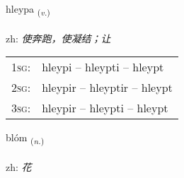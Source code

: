 \documentclass[frontgrid, backgrid]{flacards}\usepackage[]{graphicx}\usepackage[]{color}
\begin{document}
\renewcommand{\blhead}{\vskip5pt {\small\bfseries\footnotesize Sagnorð | 动词 }}
\renewcommand{\bcfoot}{\vskip5pt \hspace{2pt}{\small\bfseries\footnotesize 2K}}


{hleypa \small{\textsubscript{(\textit{v.})}} \\[1ex] %
\textphonetic{[l̥eiːpa]} \\
zh: \emph{使奔跑，使凝结；让} \\  [2ex]
\renewcommand*{\arraystretch}{0.8}
\begin{tabular}{p{1cm}l}
\textsc{1sg}: & hleypi -- hleypti -- hleypt \\ 
\textsc{2sg}: & hleypir -- hleyptir -- hleypt \\ 
\textsc{3sg}: & hleypir -- hleypti -- hleypt \\ 
\end{tabular}
}

\renewcommand{\flhead}{\vskip5pt \fboxsep=0pt {\small\bfseries\footnotesize Nafnorð | 名词}}
\renewcommand{\fcfoot}{\vskip5pt \fboxsep=0pt \hspace{2pt}{\small\bfseries\footnotesize 2K}}

\renewcommand{\blhead}{\vskip5pt {\small\bfseries\footnotesize Nafnorð | 名词 }}
\renewcommand{\bcfoot}{\vskip5pt \hspace{2pt}{\small\bfseries\footnotesize 2K}}


{blóm \small{\textsubscript{(\textit{n.})}} \\[1ex] %
\textphonetic{[plouːm]} \\
zh: \emph{花} \\  [2ex]
\renewcommand*{\arraystretch}{0.8}
}

\renewcommand{\flhead}{\vskip5pt \fboxsep=0pt {\small\bfseries\footnotesize Sagnorð | 动词}}
\renewcommand{\fcfoot}{\vskip5pt \fboxsep=0pt \hspace{2pt}{\small\bfseries\footnotesize 2K}}
\end{document}
